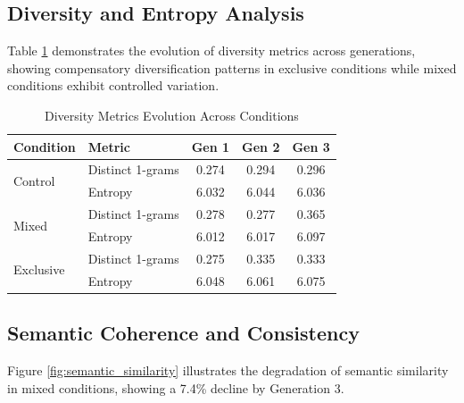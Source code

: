 \documentclass{article}
\begin{document}
\subsection{Diversity and Entropy Analysis}

Table \ref{tab:diversity_evolution} demonstrates the evolution of diversity metrics across generations, showing compensatory diversification patterns in exclusive conditions while mixed conditions exhibit controlled variation.

\begin{table}[H]
\centering
\caption{Diversity Metrics Evolution Across Conditions}
\label{tab:diversity_evolution}
\begin{tabular}{llccc}
\toprule
\textbf{Condition} & \textbf{Metric} & \textbf{Gen 1} & \textbf{Gen 2} & \textbf{Gen 3} \\
\midrule
\multirow{2}{*}{Control} & Distinct 1-grams & 0.274 & 0.294 & 0.296 \\
 & Entropy & 6.032 & 6.044 & 6.036 \\
\midrule
\multirow{2}{*}{Mixed} & Distinct 1-grams & 0.278 & 0.277 & 0.365 \\
 & Entropy & 6.012 & 6.017 & 6.097 \\
\midrule
\multirow{2}{*}{Exclusive} & Distinct 1-grams & 0.275 & 0.335 & 0.333 \\
 & Entropy & 6.048 & 6.061 & 6.075 \\
\bottomrule
\end{tabular}
\end{table}

\subsection{Semantic Coherence and Consistency}

Figure \ref{fig:semantic_similarity} illustrates the degradation of semantic similarity in mixed conditions, showing a 7.4\% decline by Generation 3.
\end{document}
